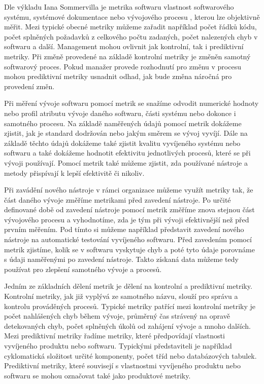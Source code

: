\documentclass[czech,master,public,dept460,male,cpdeclaration,oneside]{diploma}
\begin{document}
Dle výkladu Iana Sommervilla \cite{ref:metric_definition} je metrika softwaru vlastnost softwarového systému, systémové dokumentace nebo vývojového procesu , kterou lze objektivně měřit. Mezi typické obecné metriky můžeme zařadit například počet řádků kódu, počet splněných požadavků z celkového počtu zadaných, počet nalezených chyb v softwaru a další. Management mohou ovlivnit jak kontrolní, tak i prediktivní metriky. Při změně provedené na základě kontrolní metriky je změněn samotný softwarový proces. Pokud manažer provede rozhodnutí pro změnu v procesu mohou prediktivní metriky usnadnit odhad, jak bude změna náročná pro provedení změn. 

Při měření vývoje softwaru pomocí metrik se snažíme odvodit numerické hodnoty nebo profil atributu vývoje daného softwaru, části systému nebo dokonce i samotného procesu. Na základě naměřených údajů pomocí metrik dokážeme zjistit, jak je standard dodržován nebo jakým směrem se vývoj vyvíjí. Dále na základě těchto údajů dokážeme také zjistit kvalitu vyvíjeného systému nebo softwaru a také dokážeme hodnotit efektivitu jednotlivých procesů, které se při vývoji používají. Pomocí metrik také můžeme zjistit, zda používané nástroje a metody přispívají k lepší efektivitě či nikoliv.

Při zavádění nového nástroje v rámci organizace můžeme využít metriky tak, že část daného vývoje změříme metrikami před zavedení nástroje. Po určité definované době od zavedení nástroje pomocí metrik změříme znova stejnou část vývojového procesu a vyhodnotíme, zda je tým při vývoji efektivnější než před prvním měřením. Pod tímto si můžeme například představit zavedení nového nástroje na automatické testování vyvíjeného softwaru. Před zavedením pomocí metrik zjistíme, kolik se v softwaru vyskytuje chyb a poté tyto údaje porovnáme s údaji naměřenými po zavedení nástroje. Takto získaná data můžeme tedy používat pro zlepšení samotného vývoje a procesů.

Jedním ze základních dělení metrik je dělení na kontrolní a prediktivní metriky. Kontrolní metriky, jak již vyplývá ze samotného názvu, slouží pro správu a kontrolu prováděných procesů. Typické metriky patřící mezi kontrolní metriky je počet nahlášených chyb během vývoje, průměrný čas strávený na opravě detekovaných chyb, počet splněných úkolů od zahájení vývoje a mnoho dalších. Mezi prediktivní metriky řadíme metriky, které předpovídají vlastnosti vyvíjeného produktu nebo softwaru. Typickými představiteli je například cyklomatická složitost určité komponenty, počet tříd nebo databázových tabulek. Prediktivní metriky, které souvisejí s vlastnostmi vyvíjeného produktu nebo softwaru se mohou označovat také jako produktové metriky. \cite{ref:metric_definition} 
\end{document}
